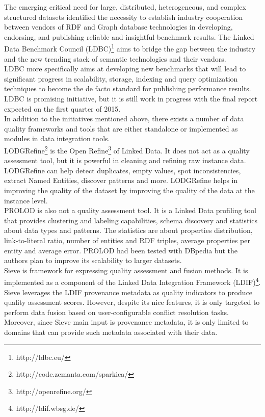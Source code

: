 \documentclass[onecolumn, crcready]{iosart2c}
\begin{document}
The emerging critical need for large, distributed, heterogeneous, and complex structured datasets identified the necessity to establish industry cooperation between vendors of RDF and Graph database technologies in developing, endorsing, and publishing reliable and insightful benchmark results. The Linked Data Benchmark Council (LDBC)\footnote{http://ldbc.eu/} aims to bridge the gap between the industry and the new trending stack of semantic technologies and their vendors. \\ LDBC more specifically aims at developing new benchmarks that will lead to significant progress in scalability, storage, indexing and query optimization techniques to become the de facto standard for publishing performance results. LDBC is promising initiative, but it is still work in progress with the final report expected on the first quarter of 2015.\\

In addition to the initiatives mentioned above, there exists a number of data quality frameworks and tools that are either standalone or implemented as modules in data integration tools. \\

LODGRefine\footnote{http://code.zemanta.com/sparkica/} is the Open Refine\footnote{http://openrefine.org/} of Linked Data. It does not act as a quality assessment tool, but it is powerful in cleaning and refining raw instance data. LODGRefine can help detect duplicates, empty values, spot inconsistencies, extract Named Entities, discover patterns and more. LODGRefine helps in improving the quality of the dataset by improving the quality of the data at the instance level.\\


PROLOD \cite{Bohm2010} is also not a quality assessment tool. It is a Linked Data profiling tool that provides clustering and labeling capabilities, schema discovery and statistics about data types and patterns. The statistics are about properties distribution, link-to-literal ratio, number of entities and RDF triples, average properties per entity and average error. PROLOD had been tested with DBpedia but the authors plan to improve its scalability to larger datasets.\\


Sieve \cite{Mendes2012} is framework for expressing quality assessment and fusion methods. It is implemented as a component of the Linked Data Integration Framework (LDIF)\footnote{http://ldif.wbsg.de/}. Sieve leverages the LDIF provenance metadata as quality indicators to produce quality assessment scores. However, despite its nice features, it is only targeted to perform data fusion based on user-configurable conflict resolution tasks. Moreover, since Sieve main input is provenance metadata, it is only limited to domains that can provide such metadata associated with their data.\\
\end{document}
